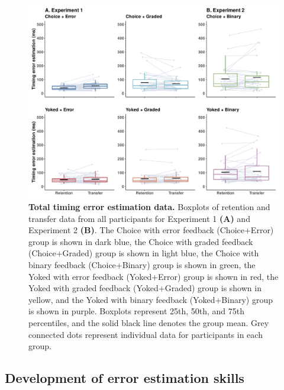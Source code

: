 \documentclass[
  doc, donotrepeattitle,floatsintext]{apa7}
\begin{document}
\begin{figure}

{\centering \includegraphics{../../figs/figS2} 

}

\caption{\small \onehalfspacing \textbf{Total timing error estimation data.} Boxplots of retention and transfer data from all participants for Experiment 1 \textbf{(A)} and Experiment 2 \textbf{(B)}. The Choice with error feedback (Choice+Error) group is shown in dark blue, the Choice with graded feedback (Choice+Graded) group is shown in light blue, the Choice with binary feedback (Choice+Binary) group is shown in green, the Yoked with error feedback (Yoked+Error) group is shown in red, the Yoked with graded feedback (Yoked+Graded) group is shown in yellow, and the Yoked with binary feedback (Yoked+Binary) group is shown in purple. Boxplots represent 25th, 50th, and 75th percentiles, and the solid black line denotes the group mean. Grey connected dots represent individual data for participants in each group.}\label{fig:figS2}
\end{figure}



\hypertarget{development-of-error-estimation-skills}{%
\subsection{Development of error estimation skills}\label{development-of-error-estimation-skills}}
\end{document}
